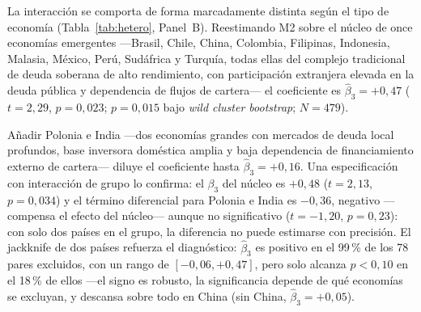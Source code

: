 La interacción se comporta de forma marcadamente distinta según el tipo de economía (Tabla~\ref{tab:hetero}, Panel~B). Reestimando M2 sobre el núcleo de once economías emergentes —Brasil, Chile, China, Colombia, Filipinas, Indonesia, Malasia, México, Perú, Sudáfrica y Turquía, todas ellas del complejo tradicional de deuda soberana de alto rendimiento, con participación extranjera elevada en la deuda pública y dependencia de flujos de cartera— el coeficiente es $\hat\beta_3 = +0{,}47$ ($t=2{,}29$, $p=0{,}023$; $p=0{,}015$ bajo \textit{wild cluster bootstrap}; $N=479$).

Añadir Polonia e India —dos economías grandes con mercados de deuda local profundos, base inversora doméstica amplia y baja dependencia de financiamiento externo de cartera— diluye el coeficiente hasta $\hat\beta_3=+0{,}16$. Una especificación con interacción de grupo lo confirma: el $\beta_3$ del núcleo es $+0{,}48$ ($t=2{,}13$, $p=0{,}034$) y el término diferencial para Polonia e India es $-0{,}36$, negativo —compensa el efecto del núcleo— aunque no significativo ($t=-1{,}20$, $p=0{,}23$): con solo dos países en el grupo, la diferencia no puede estimarse con precisión. El jackknife de dos países refuerza el diagnóstico: $\hat\beta_3$ es positivo en el 99\,\% de los 78 pares excluidos, con un rango de $[-0{,}06, +0{,}47]$, pero solo alcanza $p<0{,}10$ en el 18\,\% de ellos —el signo es robusto, la significancia depende de qué economías se excluyan, y descansa sobre todo en China (sin China, $\hat\beta_3=+0{,}05$).

